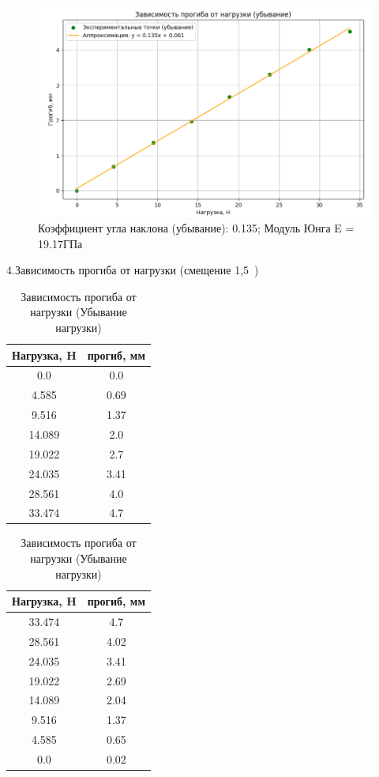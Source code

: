 \documentclass[a4paper, 12pt]{article}
\begin{document}
\vspace{2cm} %

\begin{figure}[h]
\centering
\includegraphics[width=0.8\linewidth]{G2.png}
\caption{Коэффициент угла наклона (убывание): 0.135; Модуль Юнга E = 19.17ГПа}
\label{fig:decrease}
\end{figure}


\clearpage


4.Зависимость прогиба от нагрузки (смещение 1,5\ )

\begin{table}[h]
\centering
\begin{minipage}{0.45\textwidth}
\centering
\caption{Зависимость прогиба от нагрузки (Возрастание нагрузки)}
\begin{tabular}{|c|c|}
\hline
Нагрузка, H & прогиб, мм \\
\hline
0.0 & 0.0 \\
\hline
4.585 & 0.69 \\
\hline
9.516 & 1.37 \\
\hline
14.089 & 2.0 \\
\hline
19.022 & 2.7 \\
\hline
24.035 & 3.41 \\
\hline
28.561 & 4.0 \\
\hline
33.474 & 4.7 \\
\hline
\end{tabular}
\end{minipage}
\hfill
\begin{minipage}{0.45\textwidth}
\centering
\caption{Зависимость прогиба от нагрузки (Убывание нагрузки)}
\begin{tabular}{|c|c|}
\hline
Нагрузка, H & прогиб, мм \\
\hline
33.474 & 4.7 \\
\hline
28.561 & 4.02 \\
\hline
24.035 & 3.41 \\
\hline
19.022 & 2.69 \\
\hline
14.089 & 2.04 \\
\hline
9.516 & 1.37 \\
\hline
4.585 & 0.65 \\
\hline
0.0 & 0.02 \\
\hline
\end{tabular}
\end{minipage}
\end{table}
\end{document}
